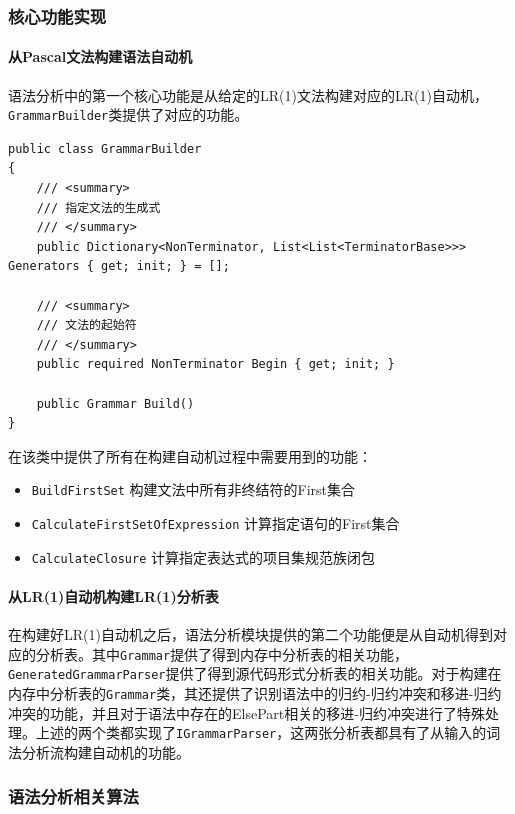 \documentclass[../main.tex]{subfiles}
\begin{document}
\subsubsection{核心功能实现}

\paragraph{从Pascal文法构建语法自动机} 语法分析中的第一个核心功能是从给定的LR(1)文法构建对应的LR(1)自动机，\texttt{GrammarBuilder}类提供了对应的功能。

\begin{lstlisting}[style=csharp]
public class GrammarBuilder
{
    /// <summary>
    /// 指定文法的生成式
    /// </summary>
    public Dictionary<NonTerminator, List<List<TerminatorBase>>> Generators { get; init; } = [];

    /// <summary>
    /// 文法的起始符
    /// </summary>
    public required NonTerminator Begin { get; init; }

    public Grammar Build()
}
\end{lstlisting}

在该类中提供了所有在构建自动机过程中需要用到的功能：
\begin{itemize}
    \item \texttt{BuildFirstSet} 构建文法中所有非终结符的First集合
    \item \texttt{CalculateFirstSetOfExpression} 计算指定语句的First集合
    \item \texttt{CalculateClosure} 计算指定表达式的项目集规范族闭包
\end{itemize}

\paragraph{从LR(1)自动机构建LR(1)分析表} 在构建好LR(1)自动机之后，语法分析模块提供的第二个功能便是从自动机得到对应的分析表。其中\texttt{Grammar}提供了得到内存中分析表的相关功能，\texttt{GeneratedGrammarParser}提供了得到源代码形式分析表的相关功能。对于构建在内存中分析表的\texttt{Grammar}类，其还提供了识别语法中的归约-归约冲突和移进-归约冲突的功能，并且对于语法中存在的ElsePart相关的移进-归约冲突进行了特殊处理。上述的两个类都实现了\texttt{IGrammarParser}，这两张分析表都具有了从输入的词法分析流构建自动机的功能。

\subsubsection{语法分析相关算法}
\end{document}
